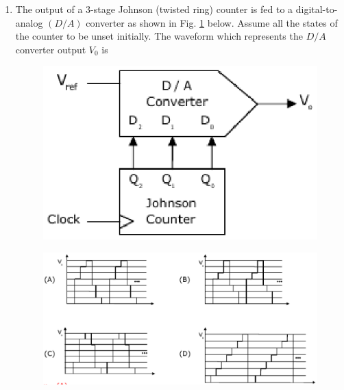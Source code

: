 \documentclass[journal,12pt,twocolumn]{IEEEtran}
\begin{document}
\begin{enumerate}
\begin{enumerate}[(a)]
\end{enumerate}

\item The output of a $3$-stage Johnson (twisted ring) counter is fed to a digital-to-analog $(D/A)$ converter as shown in Fig.  \ref{fig:43}  below. Assume all the states of the counter to be unset initially. The waveform which represents the $D/A$ converter output $V_0$ is

\begin{figure}

\centering

\includegraphics[width=\columnwidth]{./figs/49.eps}

\caption{}

\label{fig:43}

\end{figure} 

\begin{figure}

\centering

\includegraphics[width=\columnwidth]{./figs/50.eps}

\caption{}


\end{figure}
\end{enumerate}
\end{document}
